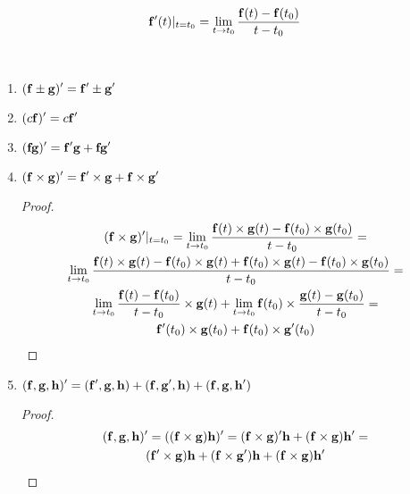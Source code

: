 \documentclass[main]{subfiles}
\begin{document}
\begin{definition}
    \[\mathbf{f}'(t)\rvert_{t=t_0} =  \lim_{t \to t_0} \frac{\mathbf{f}(t) - \mathbf{f}(t_0)}{t - t_0}\]
\end{definition}

\begin{propertylist}
    \

    \begin{enumerate}
        \item $\displaystyle (\mathbf{f} \pm \mathbf{g})' = \mathbf{f}' \pm \mathbf{g}'$
        \item $\displaystyle (c\mathbf{f})' = c\mathbf{f}'$
        \item $\displaystyle (\mathbf{f} \mathbf{g})' = \mathbf{f}'\mathbf{g} + \mathbf{f} \mathbf{g}'$
        \item $\displaystyle (\mathbf{f} \times \mathbf{g})' = \mathbf{f}' \times \mathbf{g} + \mathbf{f} \times \mathbf{g}'$
              \begin{proof}
                  \begin{multline*}
                      (\mathbf{f} \times \mathbf{g})'\rvert_{t=t_0} = \lim_{t \to t_0} \frac{\mathbf{f}(t) \times \mathbf{g}(t) - \mathbf{f}(t_0) \times \mathbf{g}(t_0)}{t - t_0} = \\
                      \lim_{t \to t_0} \frac{\mathbf{f}(t) \times \mathbf{g}(t) - \mathbf{f}(t_0) \times \mathbf{g}(t) + \mathbf{f}(t_0) \times \mathbf{g}(t) - \mathbf{f}(t_0) \times \mathbf{g}(t_0)}{t - t_0} = \\
                      \lim_{t \to t_0} \frac{\mathbf{f}(t) - \mathbf{f}(t_0)}{t - t_0} \times \mathbf{g}(t) + \lim_{t \to t_0} \mathbf{f}(t_0) \times \frac{\mathbf{g}(t) - \mathbf{g}(t_0)}{t- t_0} = \\
                      \mathbf{f}'(t_0) \times \mathbf{g}(t_0) + \mathbf{f}(t_0) \times \mathbf{g}'(t_0)
                  \end{multline*}
              \end{proof}
        \item $\displaystyle (\mathbf{f},\mathbf{g},\mathbf{h})' = (\mathbf{f}',\mathbf{g},\mathbf{h}) + (\mathbf{f},\mathbf{g}',\mathbf{h}) + (\mathbf{f},\mathbf{g},\mathbf{h}')$
              \begin{proof}
                  \begin{multline*}
                      (\mathbf{f},\mathbf{g},\mathbf{h})' = ((\mathbf{f} \times \mathbf{g}) \mathbf{h})' = (\mathbf{f} \times \mathbf{g})' \mathbf{h} + (\mathbf{f} \times \mathbf{g}) \mathbf{h}'=\\
                      (\mathbf{f}' \times \mathbf{g}) \mathbf{h} + (\mathbf{f} \times \mathbf{g}') \mathbf{h} + (\mathbf{f} \times \mathbf{g}) \mathbf{h}'
                  \end{multline*}
              \end{proof}
    \end{enumerate}
\end{propertylist}
\end{document}
